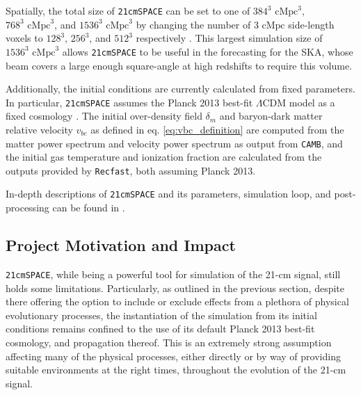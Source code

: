 \documentclass[floats,floatfix,showpacs,amssymb,prd,superscriptaddress,nofootinbib]{revtex4-2} %
\newcommand{\code}{\texttt}
\begin{document}
Spatially, the total size of \code{21cmSPACE} can be set to one of $384^3 \text{ cMpc}^3$, $768^3 \text{ cMpc}^3$, and $1536^3 \text{ cMpc}^3$ by changing the number of $3 \text{ cMpc}$ side-length voxels to $128^3$, $256^3$, and $512^3$ respectively \citep{dhandha_2022}. This largest simulation size of $1536^3 \text{ cMpc}^3$ allows \code{21cmSPACE} to be useful in the forecasting for the SKA, whose beam covers a large enough square-angle at high redshifts to require this volume. 

Additionally, the initial conditions are currently calculated from fixed parameters. In particular, \code{21cmSPACE} assumes the Planck 2013 best-fit $\Lambda$CDM model as a fixed cosmology \citep{Planck2013results}. The initial over-density field $\delta_m$ and baryon-dark matter relative velocity $v_{bc}$ as defined in eq. \ref{eq:vbc_definition} are computed \citep{Fialkov_2012} from the matter power spectrum and velocity power spectrum as output from \code{CAMB}, and the initial gas temperature and ionization fraction are calculated from the outputs provided by \code{Recfast}, both assuming Planck 2013.

In-depth descriptions of \code{21cmSPACE} and its parameters, simulation loop, and post-processing can be found in \citet{Gessey-Jones_2023, Gessey-Jones_2024, gessey-jones_thesis}.

\subsection{Project Motivation and Impact}

\code{21cmSPACE}, while being a powerful tool for simulation of the 21-cm signal, still holds some limitations. Particularly, as outlined in the previous section, despite there offering the option to include or exclude effects from a plethora of physical evolutionary processes, the instantiation of the simulation from its initial conditions remains confined to the use of its default Planck 2013 best-fit cosmology, and propagation thereof. This is an extremely strong assumption affecting many of the physical processes, either directly or by way of providing suitable environments at the right times, throughout the evolution of the 21-cm signal.
\end{document}
